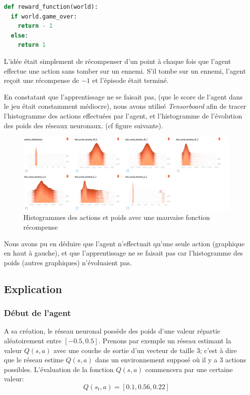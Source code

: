 \documentclass[11pt,a4paper]{report}
\begin{document}
  \begin{lstlisting}[language=python]
def reward_function(world):
  if world.game_over:
    return - 1
  else:
    return 1
  \end{lstlisting} 
  
  \par L'idée était simplement de récompenser d'un point à chaque fois que l'agent effectue une action sans tomber sur un ennemi. S'il tombe sur un ennemi, l'agent reçoit une récompense de $-1$ et l'épisode était terminé.
  
  \par En constatant que l'apprentissage ne se faisait pas, (que le score de l'agent dans le jeu était constamment médiocre), nous avons utilisé \textit{Tensorboard} afin de tracer l'histogramme des actions effectuées par l'agent, et l'histogramme de l'évolution des poids des réseaux neuronaux. (cf figure suivante).
  
  \begin{figure}[!h]
   \center
   \includegraphics[scale=0.4]{ressources/bad_reward_histograms.png}
   \caption{Histogrammes des actions et poids avec une mauvaise fonction récompense}
   \end{figure} 
   
 \newpage
 \par Nous avons pu en déduire que l'agent n'effectuait qu'une seule action (graphique en haut à gauche), et que l'apprentissage ne se faisait pas car l'histogramme des poids (autres graphiques) n'évoluaient pas. 
  
  \subsection{Explication}
  
  \subsubsection{Début de l'agent}
  
  \par A sa création, le réseau neuronal possède des poids d'une valeur répartie aléatoirement entre $[-0.5,0.5]$. Prenons par exemple un réseau estimant la valeur $Q(s,a)$ avec une couche de sortie d'un vecteur de taille 3; c'est à dire que le réseau estime $Q(s,a)$ dans un environnement supposé où il y a 3 actions possibles. L'évaluation de la fonction $Q(s,a)$ commencera par une certaine valeur: 
  $$Q(s_t, a) = [0.1, 0.56, 0.22]$$
  
\end{document}
